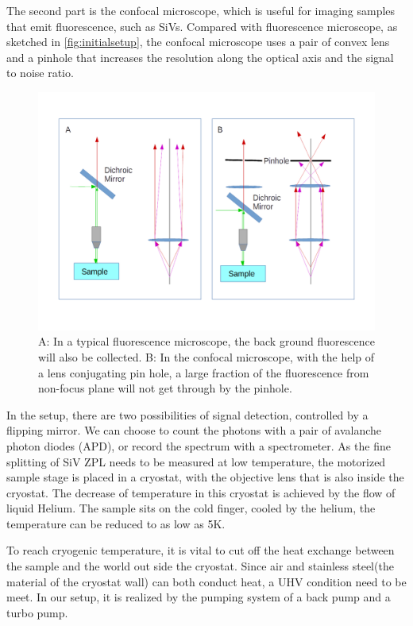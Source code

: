The second part is the confocal microscope, which is useful for imaging samples that emit fluorescence, such as SiVs. Compared with fluorescence microscope, as sketched in \ref{fig:initialsetup}, the confocal microscope uses a pair of convex lens and a pinhole that increases the resolution along the optical axis and the signal to noise ratio.
\begin{figure}[h]
	\centering
	\includegraphics[width=1\linewidth]{Figures/pic/microscope}
	\caption{A: In a typical fluorescence microscope, the back ground fluorescence will also be collected. B: In the confocal microscope, with the help of a lens conjugating pin hole, a large fraction of the fluorescence from non-focus plane will not get through by the pinhole.}
	\label{fig:microscope}
\end{figure}
In the setup, there are two possibilities of signal detection, controlled by a flipping mirror. We can choose to count the photons with a pair of avalanche photon diodes (APD), or record the spectrum with a spectrometer.
As the fine splitting of SiV ZPL needs to be measured at low temperature, the motorized sample stage is placed in a cryostat, with the objective lens that is also inside the cryostat. The decrease of temperature in this cryostat is achieved by the flow of liquid Helium. The sample sits on the cold finger, cooled by the helium, the temperature can be reduced to as low as 5K.

To reach cryogenic temperature, it is vital to cut off the heat exchange between the sample and the world out side the cryostat. Since air and stainless steel(the material of the cryostat wall) can both conduct heat, a UHV condition need to be meet. In our setup, it is realized by the pumping system of a back pump and a turbo pump. 

